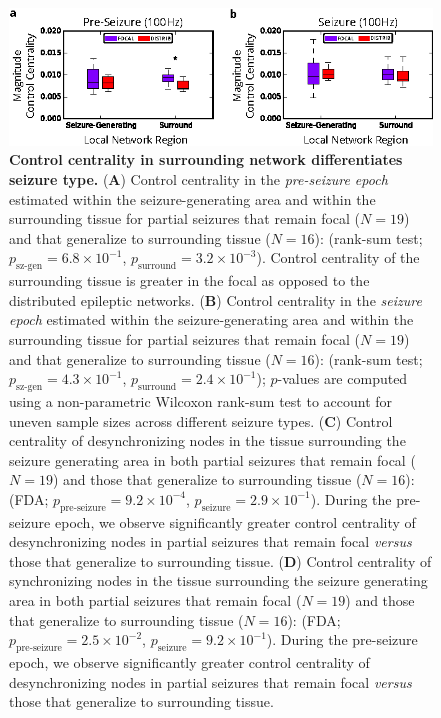 \begin{figure}[H]
    \centering
    \includegraphics[width=\textwidth]{panel4.eps}
    \caption[Control centrality of surrounding network structures]{\textbf{Control centrality in surrounding network differentiates seizure type.} (\textbf{A}) Control centrality in the \textit{pre-seizure epoch} estimated within the seizure-generating area and within the surrounding tissue for partial seizures that remain focal ($N=19$) and that generalize to surrounding tissue ($N=16$): (rank-sum test; $p_\text{sz-gen}=6.8\times10^{-1}$, $p_\text{surround}=3.2\times10^{-3}$). Control centrality of the surrounding tissue is greater in the focal as opposed to the distributed epileptic networks. (\textbf{B}) Control centrality in the \textit{seizure epoch} estimated within the seizure-generating area and within the surrounding tissue for partial seizures that remain focal ($N=19$) and that generalize to surrounding tissue ($N=16$): (rank-sum test; $p_\text{sz-gen}=4.3\times10^{-1}$, $p_\text{surround}=2.4\times10^{-1}$); $p$-values are computed using a non-parametric Wilcoxon rank-sum test to account for uneven sample sizes across different seizure types. (\textbf{C}) Control centrality of desynchronizing nodes in the tissue surrounding the seizure generating area in both partial seizures that remain focal ($N=19$) and those that generalize to surrounding tissue ($N=16$): (FDA; $p_\text{pre-seizure}=9.2\times10^{-4}$, $p_\text{seizure}=2.9\times10^{-1}$). During the pre-seizure epoch, we observe significantly greater control centrality of desynchronizing nodes in partial seizures that remain focal \emph{versus} those that generalize to surrounding tissue. (\textbf{D}) Control centrality of synchronizing nodes in the tissue surrounding the seizure generating area in both partial seizures that remain focal ($N=19$) and those that generalize to surrounding tissue ($N=16$): (FDA; $p_\text{pre-seizure}=2.5\times10^{-2}$, $p_\text{seizure}=9.2\times10^{-1}$). During the pre-seizure epoch, we observe significantly greater control centrality of desynchronizing nodes in partial seizures that remain focal \emph{versus} those that generalize to surrounding tissue. \label{ch5:fig4}}
\end{figure}

